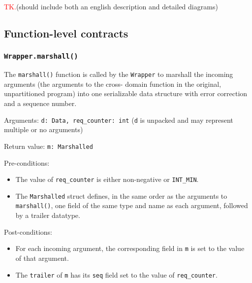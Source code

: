 \documentclass[11pt, oneside]{article}
\newcommand{\todo}{\textcolor{red}{TK.}}
\begin{document}
            \todo (should include both an english description and detailed diagrams)

        \subsection{Function-level contracts}

            \subsubsection{\texttt{Wrapper.marshall()}}

                The \texttt{marshall()} function is called by the \texttt{Wrapper}
                to marshall the incoming arguments (the arguments to the cross-
                domain function in the original, unpartitioned program) into one
                serializable data structure with error correction and a sequence
                number.

                Arguments: \texttt{d: Data, req\_counter: int}
                (\texttt{d} is unpacked and may represent multiple or no arguments)

                Return value: \texttt{m: Marshalled}

                Pre-conditions:
                \begin{itemize}
                    \item The value of \texttt{req\_counter} is either non-negative
                    or \texttt{INT\_MIN}.
                    \item The \texttt{Marshalled} struct defines, in 
                    the same order as the arguments to \texttt{marshall()}, one 
                    field of the same type and name as each argument, followed 
                    by a trailer datatype.
                \end{itemize}

                Post-conditions:
                \begin{itemize}
                    \item For each incoming argument, the
                    corresponding field in \texttt{m} is set to the value of that
                    argument.
                    \item The \texttt{trailer} of \texttt{m} has its \texttt{seq} 
                    field set to the value of \texttt{req\_counter}.
                \end{itemize}
\end{document}
